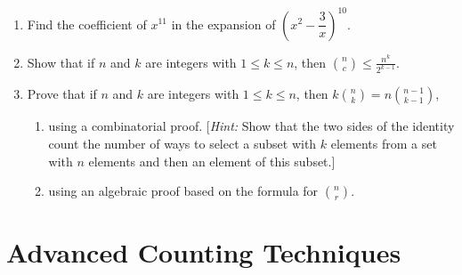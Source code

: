 \documentclass{sig-alternate-05-2015}
\begin{document}
\begin{enumerate}
	\item Find the coefficient of $x^{11}$ in the expansion of $(x^2-\dfrac{3}{x})^{10}$.
	
	\item Show that if $n$ and $k$ are integers with $1 \le k \le n$, then $\binom{n}{c} \le \frac{n^k}{2^{k - 1}}$.

	\item Prove that if $n$ and $k$ are integers with $1 \le k \le n$, then $k \binom{n}{k} = n \binom{n - 1}{k - 1}$,\begin{enumerate}
		\item using a combinatorial proof. [\textit{Hint:} Show that the two sides of the identity count the number of ways to select a subset with $k$ elements from a set with $n$ elements and then an element of this subset.]
		\item using an algebraic proof based on the formula for $\binom{n}{r}$.
	\end{enumerate}
\end{enumerate}

\section{Advanced Counting Techniques}
\end{document}
